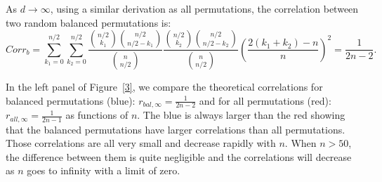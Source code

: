 \documentclass[12pt]{article}
\begin{document}
\begin{appendices}


As $d\to \infty$, using a similar derivation as all permutations, the correlation between two random balanced permutations is:
$$Corr_b=\sum_{k_1=0}^{n/2} \sum_{k_2=0}^{n/2} \frac{{n/2 \choose k_1}{n/2 \choose n/2-k_1}}{{n \choose n/2}} \frac{{n/2 \choose k_2}{n/2 \choose n/2-k_2}}{{n \choose n/2}}(\frac{2(k_1+k_2)-n}{n})^2=\frac{1}{2n-2}.$$

In the left panel of Figure~\ref{3}, we compare the theoretical correlations for balanced permutations (blue): $r_{bal, \infty}=\frac{1}{2n-2}$ and for all permutations (red): $r_{all, \infty}=\frac{1}{2n-1}$ as functions of $n$. The blue is always larger than the red showing that the balanced permutations have larger correlations than all permutations. Those correlations are all very small and decrease rapidly with $n$. When $n>50$, the difference between them is quite negligible and the correlations will decrease as $n$ goes to infinity with a limit of zero. 


\end{appendices}
\end{document}
